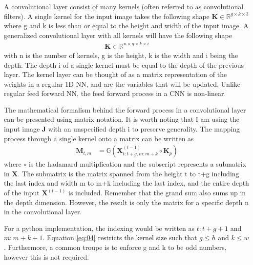 \documentclass[%
 uio,
 jmp,
 amsmath,amssymb,
 reprint, nofootinbib]{revtex4-1}
\numberwithin{equation}{section}
\newcommand{\lp}{\left(}
\newcommand{\rp}{\right)}
\begin{document}
A convolutional layer consist of many kernels (often referred to as convolutional filters). A single kernel for the input image takes the following shape \(\bm{K} \in \mathbb{R}^{g\times k\times 3}\) where g and k is less than or equal to the height and width of the input image. A generalized convolutional layer with all kernels will have the following shape
\begin{align}\label{eq:06}
\bm{K} \in \mathbb{R}^{n \times g\times k\times i}
\end{align}
with n is the number of kernels, g is the height, k is the width and i being the depth. The depth i of a single kernel must be equal to the depth of the previous layer. The kernel layer can be thought of as a matrix representation of the weights in a regular 1D NN, and are the variables that will be updated. Unlike regular feed forward NN, the feed forward process in a CNN is non-linear.

The mathematical formalism behind the forward process in a convolutional layer can be presented using matrix notation. It is worth noting that I am using the input image \(\bm{J}\) with an unspecified depth i to preserve generality. The mapping process through a single kernel onto a matrix can be written as
\begin{align}\label{eq:04}
\bm{M}_{t,m} &= \mathbb{G}\lp\bm{X}^{(l-1)}_{t:t + g, m:m + k} \circ \bm{K}_{p}\rp
\end{align}
where \(\circ\) is the hadamard multiplication and the subscript represents a submatrix in \(\bm{X}\). The submatrix is the matrix spanned from the height t to t+g including the last index and width m to m+k including the last index, and the entire depth of the input \(\bm{X}^{(l-1)}\) is included. Remember that the grand sum also sums up in the depth dimension. However, the result is only the matrix for a specific depth n in the convolutional layer.

For a python implementation, the indexing would be written as \(t:t+g+1\) and \(m:m+k+1\). Equation \ref{eq:04} restricts the kernel size such that \(g \leq h\) and \(k \leq w\). Furthermore, a common troupe is to enforce g and k to be odd numbers, however this is not required.
\end{document}
